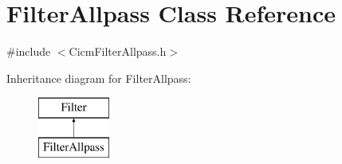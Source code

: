 \hypertarget{class_filter_allpass}{\section{Filter\-Allpass Class Reference}
\label{class_filter_allpass}
}


{\ttfamily \#include $<$Cicm\-Filter\-Allpass.\-h$>$}

Inheritance diagram for Filter\-Allpass\-:\begin{figure}[H]
\begin{center}
\leavevmode
\includegraphics[height=2.000000cm]{class_filter_allpass}
\end{center}
\end{figure}
